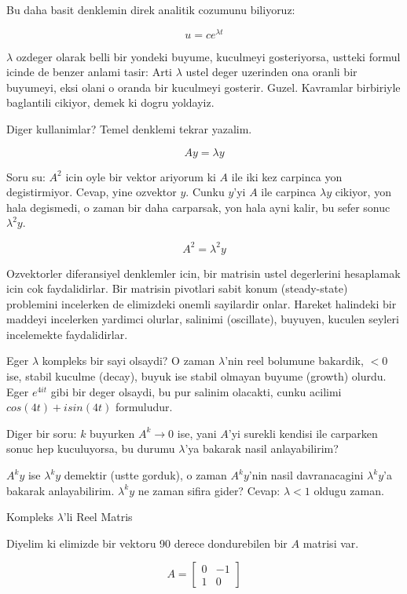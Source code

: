 \documentclass[12pt,fleqn]{article}
\begin{document}
Bu daha basit denklemin direk analitik cozumunu biliyoruz:

\[ u = ce^{\lambda t} \]

$\lambda$ ozdeger olarak belli bir yondeki buyume, kuculmeyi gosteriyorsa,
ustteki formul icinde de benzer anlami tasir: Arti $\lambda$ ustel deger
uzerinden ona oranli bir buyumeyi, eksi olani o oranda bir kuculmeyi
gosterir. Guzel. Kavramlar birbiriyle baglantili cikiyor, demek ki dogru
yoldayiz.

Diger kullanimlar? Temel denklemi tekrar yazalim. 

\[ Ay = \lambda y \]

Soru su: $A^2$ icin oyle bir vektor ariyorum ki $A$ ile iki kez carpinca
yon degistirmiyor. Cevap, yine ozvektor $y$. Cunku $y$'yi $A$ ile carpinca
$\lambda y$ cikiyor, yon hala degismedi, o zaman bir daha carparsak, yon
hala ayni kalir, bu sefer sonuc $\lambda^2y$.

\[ A^2 = \lambda^2 y \]

Ozvektorler diferansiyel denklemler icin, bir matrisin ustel degerlerini
hesaplamak icin cok faydalidirlar. Bir matrisin pivotlari sabit konum
(steady-state) problemini incelerken de elimizdeki onemli sayilardir
onlar. Hareket halindeki bir maddeyi incelerken yardimci olurlar, salinimi
(oscillate), buyuyen, kuculen seyleri incelemekte faydalidirlar.

Eger $\lambda$ kompleks bir sayi olsaydi? O zaman $\lambda$'nin reel
bolumune bakardik, $< 0$ ise, stabil kuculme (decay), buyuk ise stabil
olmayan buyume (growth) olurdu. Eger $e^{4it}$ gibi bir deger olsaydi, bu
pur salinim olacakti, cunku acilimi $cos(4t) + isin(4t)$ formuludur.

Diger bir soru: $k$ buyurken $A^k \to 0$ ise, yani $A$'yi surekli kendisi
ile carparken sonuc hep kuculuyorsa, bu durumu $\lambda$'ya bakarak nasil
anlayabilirim? 

$A^ky$ ise $\lambda^ky$ demektir (ustte gorduk), o zaman $A^ky$'nin nasil
davranacagini $\lambda^ky$'a bakarak anlayabilirim. $\lambda^ky$ ne zaman
sifira gider? Cevap: $\lambda < 1$ oldugu zaman.

Kompleks $\lambda$'li Reel Matris

Diyelim ki elimizde bir vektoru 90 derece dondurebilen bir $A$ matrisi
var. 

\[ 
A = 
\left[
\begin{array}{rr}
0 & -1 \\
1 & 0
\end{array}
\right]
 \]
\end{document}
